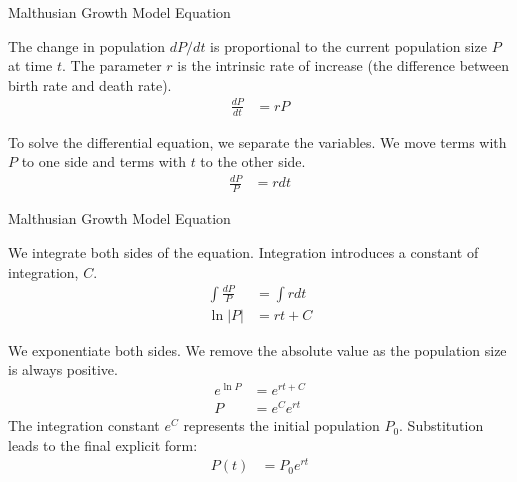 \begin{frame}{Malthusian Growth Model Equation}

The change in population $dP/dt$ is proportional to the current population size $P$ at time $t$. The parameter $r$ is the intrinsic rate of increase (the difference between birth rate and death rate).
    \begin{align*}
    \frac{dP}{dt} &= rP
  \end{align*}
\vfill

To solve the differential equation, we separate the variables.
We move terms with $P$ to one side and terms with $t$ to the other side.
    \begin{align*}
    \frac{dP}{P} &= r dt
  \end{align*}
\end{frame}


\begin{frame}{Malthusian Growth Model Equation}

We integrate both sides of the equation. Integration introduces a constant of integration, $C$.
   \begin{align*}
    \int \frac{dP}{P} &= \int r dt \\
    \ln|P| &= rt + C
  \end{align*}

We exponentiate both sides. We remove the absolute value as the population size is always positive.
\begin{align*}
e^{\ln P} &= e^{rt + C}  \\
P &= e^{C} e^{rt}  
\end{align*}
The integration constant $e^C$ represents the initial population $P_0$. Substitution leads to the final explicit form:
\begin{align*}
    P(t) &= P_0 e^{rt} 
  \end{align*}
\end{frame}


